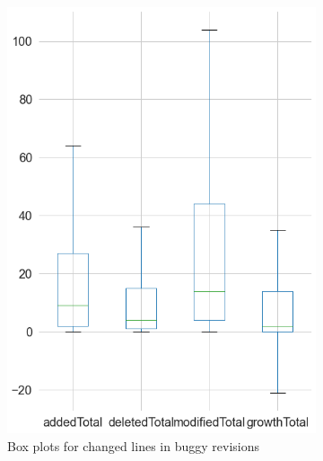 \begin{figure}[H]
\begin{subfigure}{0.5\textwidth}
	\end{subfigure}%
	\begin{subfigure}{0.5\textwidth}
		\centering
		\includegraphics[scale=0.3]{./src/data_analysis/buggy_box_lines.png}
		\caption{Box plots for changed lines in buggy revisions}
	\end{subfigure}
	\caption{}
	\label{box:changed_lines}
\end{figure}

